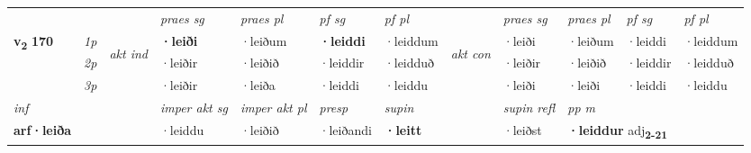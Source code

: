 \begin{longtable}[l]{X>{\footnotesize\itshape}llXXXXlXXXX}
 & &   & \textit{praes sg}  & \textit{praes pl}    & \textit{ pf sg} & \textit{pf pl} & & \textit{praes sg}  & \textit{praes pl}    & \textit{pf sg} & \textit{pf pl }  \\ \cmidrule{4-7} \cmidrule{9-12}
 \multirow{2}{*}{{{\textbf{v{\textsubscript{2}}} \Large{\textbf{170}}}}}  & 1p & \multirow{3}{*}{\begin{turn}{90}\textit{akt ind}\end{turn}} & \textbf{·leiði} & ·leiðum & \textbf{·leiddi} & ·leiddum & \multirow{3}{*}{\begin{turn}{90}\textit{akt con}\end{turn}} &·leiði & ·leiðum & ·leiddi & ·leiddum\\*
 & 2p &  &  ·leiðir  & ·leiðið & ·leiddir & ·leidduð & & ·leiðir & ·leiðið & ·leiddir & ·leidduð \\*
 & 3p &  & ·leiðir & ·leiða & ·leiddi & ·leiddu & & ·leiði & ·leiði& ·leiddi & ·leiddu \\*
\cmidrule{4-7} \cmidrule{9-12}

   {\textit{inf}} & &  & \textit{imper akt sg} & \textit{imper akt pl}   & \textit{presp} & \textit{supin} && \textit{supin refl} & \textit{pp m} \\*
  {\textbf{arf\allowbreak ·leiða}} & && ·leiddu  & ·leiðið   & ·leiðandi &  \textbf{·leitt} && ·leiðst & \multicolumn{2}{l}{\textbf{·leiddur} adj\textbf{\textsubscript{2-21}}} \\*

\midrule


\end{longtable}
